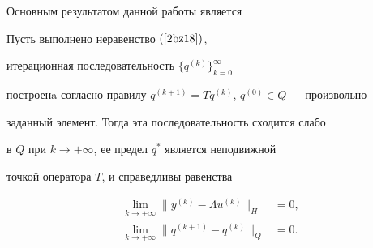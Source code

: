 Основным результатом данной работы является








\begin{thm} \label{bz_T5}


Пусть выполнено неравенство $(\ref{2bz18})$, 


итерационная последовательность $ \{{q^{(k)}} \}_{k=0} ^{\infty}$


построенa согласно правилу $q^{(k+1)}=Tq^{(k)}$, $q^{(0)} \in Q$ --- произвольно


заданный элемент. Тогда эта последовательность сходится слабо 


в $Q$ при $k \to+\infty $, ее предел $q^* $ является неподвижной


точкой оператора $T$, и справедливы равенства


\begin{align}


\lim_{k \to+\infty} \| y^{(k)}-\Lambda u^{(k)} \|_H &=0, \label{du03_27}\\


%


\lim_{k \to+\infty} \|q^{(k+1)}-q^{(k)} \|_Q &=0.\label{du03_28}


\end{align}


\end{thm}








